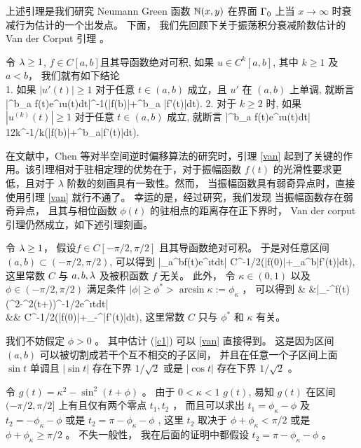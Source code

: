  上述引理是我们研究 Neumann Green 函数 $\mathbb{N}(x,y)$ 在界面 $\Gamma_0$ 上当 $x\to\infty$ 时衰减行为估计的一个出发点。 下面， 我们先回顾下关于振荡积分衰减阶数估计的 Van der Corput 引理 \cite[P.152]{grafakos} 。
 
 \begin{lem}\label{van}
 	令 $\lambda\ge 1$, $f\in C[a,b]$且其导函数绝对可积, 如果 $u\in C^k[a,b]$, 其中 $k\ge 1$ 及 $a<b$， 我们就有如下结论 \\
 	{\rm 1}. 如果 $|u'(t)|\ge 1$ 对于任意 $t\in (a,b)$ 成立，且 $u'$ 在 $(a,b)$ 上单调, 就断言
 	\ben
 	\left|\int^b_a f(t)e^{\i\lambda u(t)}dt\right|\lambda^{-1}\left(|f(b)|+\int^b_a |f'(t)|dt\right).
 	\een
 	{\rm 2}. 对于 $k\geq2$ 时, 如果 $|u^{(k)}(t)|\ge 1$ 对于任意 $t\in (a,b)$ 成立, 就断言 
 	\ben
 	\left|\int^b_a f(t)e^{\i\lambda u(t)}dt\right|\le
 	12k\lambda^{-1/k}\left(|f(b)|+\int^b_a|f'(t)|dt\right).
 	\een
 \end{lem}

在文献\cite{RTMhalf_aco}中，Chen 等对半空间逆时偏移算法的研究时，引理 \ref{van} 起到了关键的作用。该引理相对于驻相定理的优势在于，对于振幅函数 $f(t)$ 的光滑性要求更低，且对于 $\lambda$ 阶数的刻画具有一致性。然而， 当振幅函数具有弱奇异点时，直接使用引理 \ref{van} 就行不通了。 幸运的是，经过研究，我们发现 当振幅函数存在弱奇异点， 且其与相位函数 $\phi(t)$ 的驻相点的距离存在正下界时， Van der corput 引理仍然成立，如下述引理刻画。


\begin{lem}\label{lem:2.5}
	令 $\lambda\ge 1$， 假设$f\in C[-\pi/2,\pi/2]$ 且其导函数绝对可积。 于是对任意区间 $(a,b)\subset (-\pi/2,\pi/2)$, 可以得到
	\be\label{c1}
	\left|\int_a^bf(t)e^{\i\lam\cos t}dt\right| 
	\leq C\lam^{-1/2}\left(|f(0)|+\int_a^b|f'(t)|dt\right),
	\ee
	这里常数 $C$ 与 $a,b,\lambda$ 及被积函数 $f$ 无关。 
	此外， 令 $\kappa\in (0,1)$ 以及 $\phi\in (-\pi/2,\pi/2)$ 满足条件 $|\phi|\geq\phi^*>\arcsin \kappa:=\phi_\kappa$ ， 可以得到
	\be\label{c3}
	 & &\left|\int_{-\frac{}}^{\frac{}}f(t)(\kappa^2-\sin^2(t+\phi))^{-1/2}e^{\i\lam\cos t}dt\right|  \\ \nn
	&\leq& C\lam^{-1/2}\left(|f(0)|+\int_{-\frac{}}^{\frac {}}|f'(t)|dt\right),
	\ee
	这里常数 $C$ 只与 $\phi^*$ 和 $\kappa$ 有关。
\end{lem}
\debproof
我们不妨假定 $\phi>0$ 。
其中估计 (\ref{c1}) 可以 \ref{van} 直接得到。 这是因为区间 $(a,b)$ 可以被切割成若干个互不相交的子区间， 并且在任意一个子区间上面 $\sin t$ 单调且 $|\sin t|$ 存在下界 $1/\sqrt 2$ 或是 $|\cos t|$ 存在下界 $1/\sqrt 2$ 。

令 $g(t)=\kappa^2-\sin^2(t+\phi)$ 。 由于 $0<\kappa<1$ $g(t)$, 易知 $g(t)$ 在区间 $(-\pi/2,\pi/2]$ 上有且仅有两个零点 $t_1, t_2$ ， 而且可以求出
$t_1=\phi_\kappa-\phi$ 及 $t_2=-\phi_\kappa-\phi$ 或是 $t_2=\pi-\phi_\kappa-\phi$ , 这里 $t_2$ 取决于 $\phi+\phi_\kappa<\pi/2$ 或是 $\phi+\phi_\kappa\ge \pi/2$ 。 不失一般性， 我在后面的证明中都假设 $t_2=\pi-\phi_\kappa-\phi$ 。

